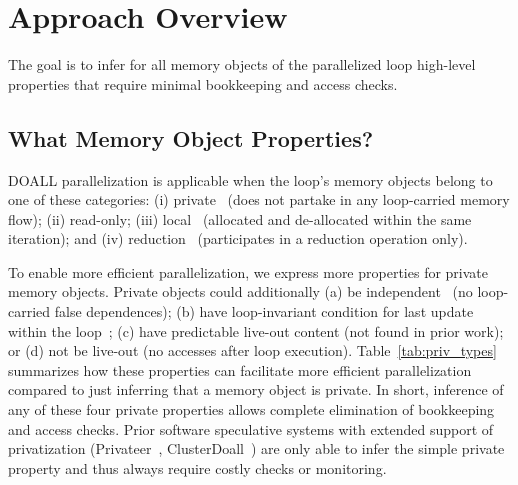 \section{Approach Overview}
\label{sec:overview}

The goal is to infer for all memory objects of the parallelized loop high-level
properties that require minimal bookkeeping and access checks.

\subsection{What Memory Object Properties?}

DOALL parallelization is applicable when the loop's memory objects belong to one
of these categories: (i) private~\cite{privateer,LRPD,ARRAY_privatization} (does
not partake in any loop-carried memory flow); (ii) read-only; (iii)
local~\cite{corD,privateer,clusterDoall} (allocated and de-allocated within the
same iteration); and (iv) reduction~\cite{privateer,LRPD} (participates in a
reduction operation only).
%

To enable more efficient parallelization, we express more properties for private
memory objects. Private objects could additionally (a) be
independent~\cite{ARRAY_privatization} (no loop-carried false dependences); (b)
have loop-invariant condition for last update within the
loop~\cite{ARRAY_privatization}; (c) have predictable live-out content (not
found in prior work); or (d) not be live-out (no accesses after loop execution).
%
%
Table~\ref{tab:priv_types} summarizes how these properties can facilitate more
efficient parallelization compared to just inferring that a memory object is
private. In short, inference of any of these four private properties allows
complete elimination of bookkeeping and access checks. Prior software
speculative systems with extended support of privatization (Privateer~\cite{},
ClusterDoall~\cite{}) are only able to infer the simple private property and
thus always require costly checks or monitoring.




